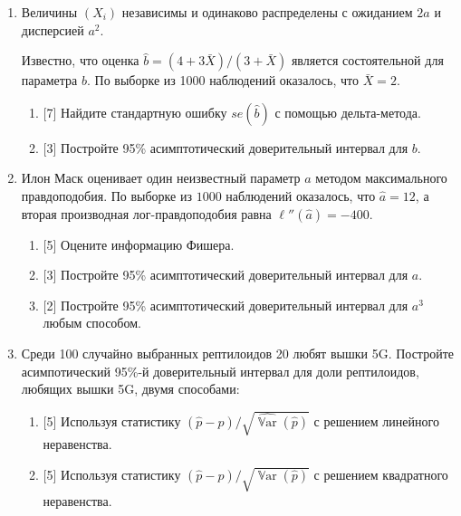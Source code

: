 \documentclass[12pt]{article}
\DeclareMathOperator{\Var}{\mathbb{V}ar}
\begin{document}
\begin{enumerate}
\item Величины $(X_i)$ независимы и одинаково распределены с ожиданием $2a$ и дисперсией $a^2$.

Известно, что оценка $\hat b = (4 + 3\bar X)/(3 + \bar X)$ является состоятельной для параметра $b$. 
По выборке из 1000 наблюдений оказалось, что $\bar X = 2$.

\begin{enumerate}
    \item {[7]} Найдите стандартную ошибку $se(\hat b)$ с помощью дельта-метода.
    \item {[3]} Постройте 95\% асимптотический доверительный интервал для $b$.
\end{enumerate}

\item Илон Маск оценивает один неизвестный параметр $a$ методом максимального правдоподобия.
По выборке из $1000$ наблюдений оказалось, что $\hat a = 12$, а вторая производная лог-правдоподобия равна $\ell''(\hat a) = -400$.
\begin{enumerate}
    \item {[5]} Оцените информацию Фишера. 
    \item {[3]} Постройте 95\% асимптотический доверительный интервал для $a$.
    \item {[2]} Постройте 95\% асимптотический доверительный интервал для $a^3$ любым способом.
\end{enumerate}

\item Среди 100 случайно выбранных рептилоидов 20 любят вышки 5G. 
Постройте асимпотический 95\%-й доверительный интервал для доли рептилоидов, любящих вышки 5G, двумя способами:
\begin{enumerate}
    \item {[5]} Используя статистику $(\hat p - p)/\sqrt{\widehat{\Var}(\hat p)}$ с решением линейного неравенства.
    \item {[5]} Используя статистику $(\hat p - p)/\sqrt{\Var(\hat p)}$ с решением квадратного неравенства.
\end{enumerate}


\end{enumerate}
\end{document}
